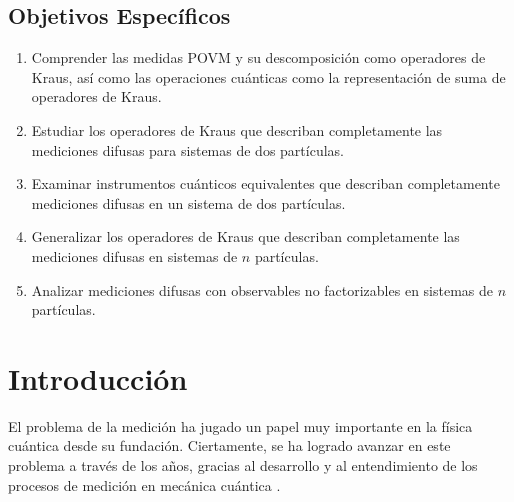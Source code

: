 \documentclass[12pt,oneside]{book}\raggedbottom{} %
\begin{document}
\begin{sloppypar}
{{%


\section*{Objetivos Específicos}
\begin{enumerate}
\item Comprender las medidas POVM y su descomposición como operadores de Kraus, así como las operaciones cuánticas como la representación de suma de operadores de Kraus. 


\item Estudiar los operadores de Kraus que describan completamente las mediciones difusas para sistemas de dos partículas.

\item 	Examinar instrumentos cuánticos equivalentes que describan completamente mediciones difusas en un sistema de dos partículas.



\item Generalizar los operadores de Kraus que describan completamente las mediciones difusas en sistemas de $n$ partículas.

\item Analizar mediciones difusas con observables no factorizables en sistemas de $n$ partículas.

\end{enumerate}
\newpage

\chapter*{Introducción}  %

El problema de la medición ha jugado un papel muy importante en la física cuántica desde su fundación. Ciertamente,  se ha logrado avanzar en este problema a través de los años, gracias al desarrollo y al entendimiento de los procesos de medición en mecánica cuántica {\cite{jacobs2014quantum}} .


}}
\end{sloppypar}
\end{document}
